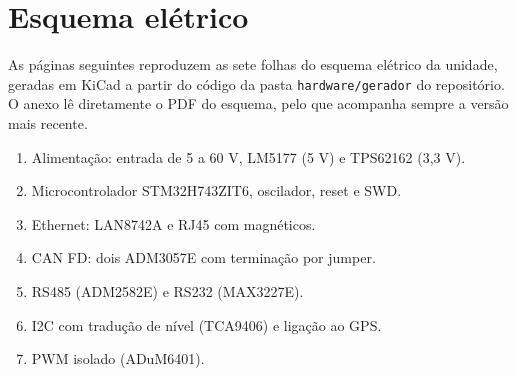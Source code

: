 \chapter{Esquema elétrico}
\label{anexo:EETS}

As páginas seguintes reproduzem as sete folhas do esquema elétrico da
unidade, geradas em KiCad a partir do código da pasta
\texttt{hardware/gerador} do repositório. O anexo lê diretamente o PDF
do esquema, pelo que acompanha sempre a versão mais recente.

\begin{enumerate}
    \item Alimentação: entrada de 5 a 60 V, LM5177 (5 V) e TPS62162 (3,3 V).
    \item Microcontrolador STM32H743ZIT6, oscilador, reset e SWD.
    \item Ethernet: LAN8742A e RJ45 com magnéticos.
    \item CAN FD: dois ADM3057E com terminação por jumper.
    \item RS485 (ADM2582E) e RS232 (MAX3227E).
    \item I2C com tradução de nível (TCA9406) e ligação ao GPS.
    \item PWM isolado (ADuM6401).
\end{enumerate}


